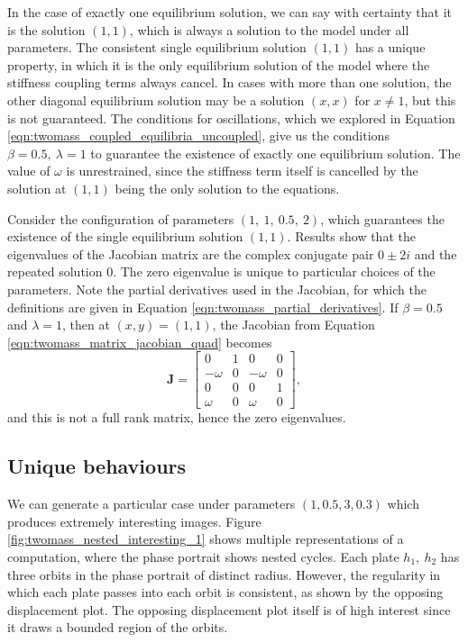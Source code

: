 In the case of exactly one equilibrium solution,
we can say with certainty that it is the solution \((1,1)\),
which is always a solution to the model under all parameters.
The consistent single equilibrium solution \((1,1)\) has a unique property,
in which it is the only equilibrium solution of the model where the stiffness coupling terms always cancel.
In cases with more than one solution, the other diagonal equilibrium solution may be a solution \((x,x)\) for $x \neq 1$,
but this is not guaranteed.
The conditions for oscillations,
which we explored in Equation \ref{eqn:twomass_coupled_equilibria_uncoupled},
give us the conditions \(\beta=0.5,~\lambda=1\) to guarantee the existence of exactly one equilibrium solution.
The value of $\omega$ is unrestrained, since the stiffness term itself is cancelled by the solution at \((1,1)\) being the only solution to the equations.

Consider the configuration of parameters \((1,~1,~0.5,~2)\),
which guarantees the existence of the single equilibrium solution \((1,1)\).
Results show that the eigenvalues of the Jacobian matrix are the complex conjugate pair $ 0 \pm 2i$ and the repeated solution $0$.  %
The zero eigenvalue is unique to particular choices of the parameters.
Note the partial derivatives used in the Jacobian, for which the definitions are given in Equation \ref{eqn:twomass_partial_derivatives}.
If $\beta = 0.5$ and $\lambda = 1$, then at \((x,y) = (1,1)\),
the Jacobian from Equation \ref{eqn:twomass_matrix_jacobian_quad} becomes
\begin{equation*}
	\mathbf{J} = \begin{bmatrix}
		0 & 1 & 0 & 0 \\
		-\omega & 0 & -\omega & 0 \\
		0 & 0 & 0 & 1 \\
		\omega & 0 & \omega & 0
	\end{bmatrix},
\end{equation*}
and this is not a full rank matrix, hence the zero eigenvalues.

\subsection{Unique behaviours}

We can generate a particular case under parameters \((1,0.5,3,0.3)\) which produces extremely interesting images.
Figure \ref{fig:twomass_nested_interesting_1} shows multiple representations of a computation,
where the phase portrait shows nested cycles.
Each plate $h_1,~h_2$ has three orbits in the phase portrait of distinct radius.
However, the regularity in which each plate passes into each orbit is consistent,
as shown by the opposing displacement plot.
The opposing displacement plot itself is of high interest since it draws a bounded region of the orbits.

